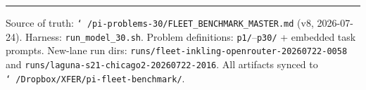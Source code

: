 \documentclass[11pt]{article}
\begin{document}
\vspace{1em}
\hrule
\vspace{0.5em}
{\footnotesize Source of truth: \texttt{\char`~/pi-problems-30/FLEET\_BENCHMARK\_MASTER.md}
(v8, 2026-07-24). Harness: \texttt{run\_model\_30.sh}. Problem definitions:
\texttt{p1/}--\texttt{p30/} + embedded task prompts. New-lane run dirs:
\texttt{runs/fleet-inkling-openrouter-20260722-0058} and
\texttt{runs/laguna-s21-chicago2-20260722-2016}. All artifacts synced to
\texttt{\char`~/Dropbox/XFER/pi-fleet-benchmark/}.}
\end{document}
